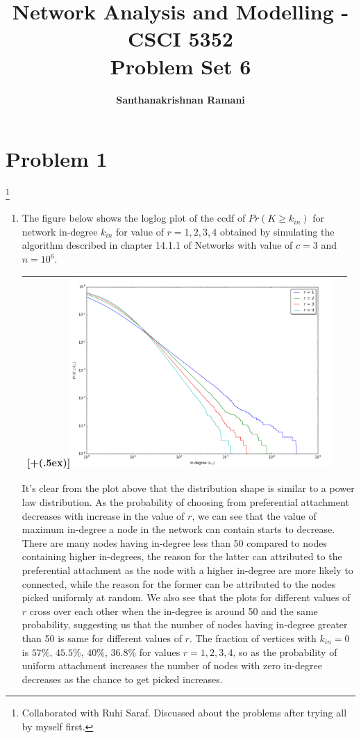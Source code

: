\documentclass{article}
\date{\displaydate{date}}
\title{\textbf{Network Analysis and Modelling - CSCI 5352} \\
Problem Set 6}
\author{\textbf{Santhanakrishnan Ramani}}
\newcommand\blfootnote[1]{%
  \begingroup
  \renewcommand\thefootnote{}\footnote{#1}%
  \addtocounter{footnote}{-1}%
  \endgroup
}
\newcommand*{\addheight}[2][.5ex]{%
  \raisebox{0pt}[\dimexpr\height+(#1)\relax]{#2}%
}
\begin{document}
\maketitle

\section*{Problem 1}
\blfootnote{Collaborated with Ruhi Saraf. Discussed about the problems after trying all by myself first.}
\begin{enumerate}[label=(\alph*)]
\item
The figure below shows the loglog plot of the ccdf of $Pr(K \geq k_{in})$ for network in-degree $k_{in}$ for value of $r={1,2,3,4}$ obtained by simulating the algorithm described in chapter 14.1.1 of Networks with value of $c=3$ and $n=10^6$.

\begin{table}[H]
\centering
\begin{tabular}{|c|c|}
	\hline
	\addheight{\includegraphics[width=100mm]{images/1a.png}} \\
	\hline
\end{tabular}
\end{table}

It's clear from the plot above that the distribution shape is similar to a power law distribution. As the probability of choosing from preferential attachment decreases with increase in the value of $r$, we can see that the value of maximum in-degree a node in the network can contain starts to decrease. There are many nodes having in-degree less than 50 compared to nodes containing higher in-degrees, the reason for the latter can attributed to the preferential attachment as the node with a higher in-degree are more likely to connected, while the reason for the former can be attributed to the nodes picked uniformly at random. We also see that the plots for different values of $r$ cross over each other when the in-degree is around 50 and the same probability, suggesting us that the number of nodes having in-degree greater than 50 is same for different values of $r$. The fraction of vertices with $k_{in} = 0$ is $57\%,\,45.5\%,\,40\%,\,36.8\%$ for values $r = 1,2,3,4$, so as the probability of uniform attachment increases the number of nodes with zero in-degree decreases as the chance to get picked increases.


\end{enumerate}
\end{document}
